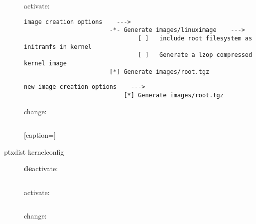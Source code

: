 \begin{description}
\begin{itemize}
		\end{itemize}

		\begin{itemize} activate:
		        \begin{lstlisting}[caption={Images TO create #1}]
                    image creation options    --->
                        -*- Generate images/linuximage    --->
                                [ ]   include root filesystem as initramfs in kernel
                                [ ]   Generate a lzop compressed kernel image
                        [*] Generate images/root.tgz
				\end{lstlisting}


		        \begin{lstlisting}[caption={Images TO create #2}]
                    new image creation options    --->
                            [*] Generate images/root.tgz
				\end{lstlisting}
		\end{itemize}

		\begin{itemize} change:
		        \begin{lstlisting}[caption={}]

				\end{lstlisting}[caption={}]
		\end{itemize}


	\item[ptxdist kernelconfig]

		\begin{itemize} \textbf{de}activate:
		        \begin{lstlisting}[caption={}]

				\end{lstlisting}
		\end{itemize}

		\begin{itemize} activate:
		        \begin{lstlisting}[caption={}]

				\end{lstlisting}
		\end{itemize}

		\begin{itemize} change:
		        \begin{lstlisting}[caption={}]

				\end{lstlisting}
		\end{itemize}


\end{description}

